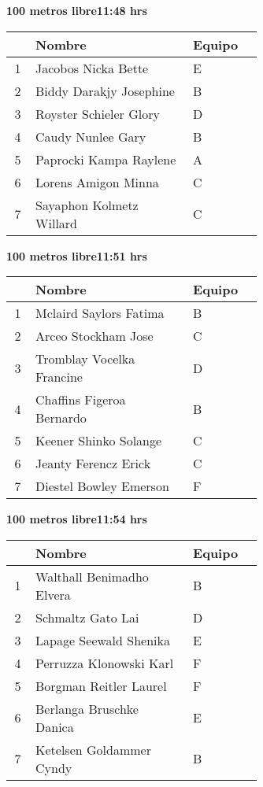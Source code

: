 \begin{minipage}{0.95\linewidth}
\begin{center}
\textbf{
100 metros libre\hspace{1cm}11:48 hrs}
\end{center}
\begin{tabular}{cp{0.63\linewidth}l}
\hline
& \textbf{Nombre} & \textbf{Equipo} \\ \hline
1 & Jacobos Nicka Bette & E \\ 
2 & Biddy Darakjy Josephine & B \\ 
3 & Royster Schieler Glory & D \\ 
4 & Caudy Nunlee Gary & B \\ 
5 & Paprocki Kampa Raylene & A \\ 
6 & Lorens Amigon Minna & C \\ 
7 & Sayaphon Kolmetz Willard & C \\ 
\end{tabular}
\end{minipage}
\begin{minipage}{0.95\linewidth}
\begin{center}
\textbf{
100 metros libre\hspace{1cm}11:51 hrs}
\end{center}
\begin{tabular}{cp{0.63\linewidth}l}
\hline
& \textbf{Nombre} & \textbf{Equipo} \\ \hline
1 & Mclaird Saylors Fatima & B \\ 
2 & Arceo Stockham Jose & C \\ 
3 & Tromblay Vocelka Francine & D \\ 
4 & Chaffins Figeroa Bernardo & B \\ 
5 & Keener Shinko Solange & C \\ 
6 & Jeanty Ferencz Erick & C \\ 
7 & Diestel Bowley Emerson & F \\ 
\end{tabular}
\end{minipage}
\begin{minipage}{0.95\linewidth}
\begin{center}
\textbf{
100 metros libre\hspace{1cm}11:54 hrs}
\end{center}
\begin{tabular}{cp{0.63\linewidth}l}
\hline
& \textbf{Nombre} & \textbf{Equipo} \\ \hline
1 & Walthall Benimadho Elvera & B \\ 
2 & Schmaltz Gato Lai & D \\ 
3 & Lapage Seewald Shenika & E \\ 
4 & Perruzza Klonowski Karl & F \\ 
5 & Borgman Reitler Laurel & F \\ 
6 & Berlanga Bruschke Danica & E \\ 
7 & Ketelsen Goldammer Cyndy & B \\ 
\end{tabular}
\end{minipage}
